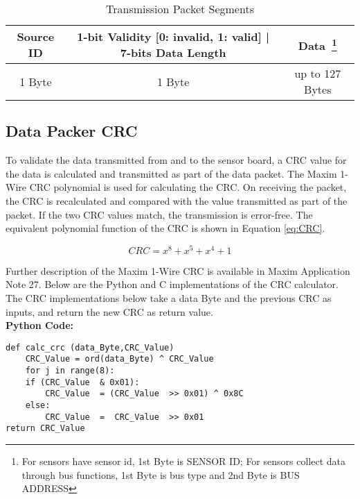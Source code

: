 \begin{table}[H]
\begin{minipage}{\textwidth}
    \centering
    {
    \begin{tabular}{|c|c|c|}
        \hline
        \rowcolor{black!8}
        \textbf{Source ID} & \textbf{1-bit Validity [0: invalid, 1: valid] | 7-bits Data Length} & \textbf{Data~\footnote{For sensors have sensor id, 1st Byte is SENSOR ID; For sensors collect data through bus functions, 1st Byte is bus type and 2nd Byte is BUS ADDRESS}} \\ \hline
        1 Byte & 1 Byte & up to 127 Bytes \\
        \hline
    \end{tabular}
    }
    \caption{Transmission Packet Segments}
    \label{table:toPlugin}
\end{minipage}
\end{table}



\subsection{Data Packer CRC} \label{ssec:crc-calc}

To validate the data transmitted from and to the sensor board, a CRC value for the data is
calculated and transmitted as part of the data packet. The Maxim 1-Wire
CRC polynomial is used for calculating the CRC.  On receiving the packet, the CRC is recalculated and compared with the value transmitted as part of
the packet. If the two CRC values match, the transmission is error-free.
The equivalent polynomial function of the CRC is shown in Equation \ref{eq:CRC}.

\begin{equation}
\label{eq:CRC}
CRC = x^8 + x^5 + x^4 + 1
\end{equation}

Further description of the Maxim 1-Wire CRC is available in Maxim Application Note 27. Below are
the Python and C implementations of the CRC calculator. The CRC implementations below take a
data Byte and the previous CRC as inputs, and return the new CRC as return value.
\\

\textbf{Python Code:}
\begin{mdframed}
\begin{lstlisting}
def calc_crc (data_Byte,CRC_Value)
    CRC_Value = ord(data_Byte) ^ CRC_Value
    for j in range(8):
    if (CRC_Value  & 0x01):
        CRC_Value  = (CRC_Value  >> 0x01) ^ 0x8C
    else:
        CRC_Value  =  CRC_Value  >> 0x01
return CRC_Value
\end{lstlisting}
\end{mdframed}

